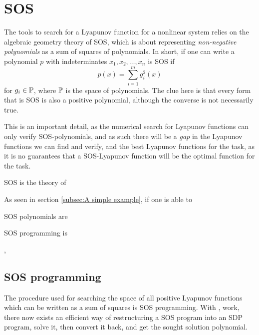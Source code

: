 \section{SOS}

The tools to search for a Lyapunov function for a nonlinear system relies on the
algebraic geometry theory of \ac{SOS}, which is about representing
\textit{non-negative polynomials} as a sum of squares of polynomials. In short,
if one can write a polynomial \(p\) with indeterminates \(x_1,x_2,\ldots,x_n\)
is \ac{SOS} if
\[
  p(x) = \sum_{i=1}^{m}g_i^2(x)
\]
for \(g_i \in \P\), where \(\P\) is the space of polynomials. The clue here is
that every form that is \ac{SOS} is also a positive polynomial, although the
converse is not necessarily true\cite{majumdarFunnelLibrariesRealTime2016}.

This is an important detail, as the numerical search for Lyapunov functions can
only verify \ac{SOS}-polynomials, and as such there will be a \textit{gap} in
the Lyapunov functions we can find and verify, and the best Lyapunov functions
for the task, as it is no guarantees that a \ac{SOS}-Lyapunov function will be
the optimal function for the task.

\ac{SOS} is the theory of

As seen in section \ref{subsec:A simple example}, if one is able to

\acl{SOS} polynomials are

\acl{SOS} programming is

\cite{parilloStructuredSemidefinitePrograms},

\subsection{SOS programming}

The procedure used for searching the space of all positive Lyapunov functions
which can be written as a sum of squares is \ac{SOS} programming. With
\cite[Parillo's]{parilloStructuredSemidefinitePrograms}, work, there now exists
an efficient way of restructuring a \ac{SOS} program into an \ac{SDP} program,
solve it, then convert it back, and get the sought solution polynomial.


